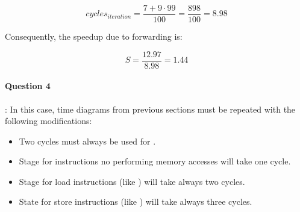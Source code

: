 \[
cycles_{iteration} = \frac{7 + 9 \cdot 99}{100} = \frac{898}{100} = 8.98
\]

Consequently, the speedup due to forwarding is:

\[
S = \frac{12.97}{8.98} = 1.44
\]

\paragraph{Question 4}: 
In this case, time diagrams from previous sections must be repeated with the
following modifications:
\begin{itemize}
  \item Two cycles must always be used for .
  \item Stage  for instructions no performing memory accesses will take one cycle.
  \item Stage  for load instructions (like ) will take always two cycles.
  \item State  for store instructions (like ) will take always three cycles.
\end{itemize}
